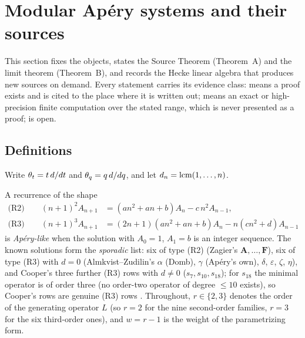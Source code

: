 \section{Modular Ap\'ery systems and their sources}\label{sec:sources}

This section fixes the objects, states the Source Theorem (Theorem~A) and the
limit theorem (Theorem~B), and records the Hecke linear algebra that produces
new sources on demand.  Every statement carries its evidence class:
\Proved{} means a proof exists and is cited to the place where it is written
out;  means an exact or high-precision finite computation
over the stated range, which is never presented as a proof; \Open{} is open.

\subsection{Definitions}\label{sec:defs}

Write $\theta_t=t\,d/dt$ and $\theta_q=q\,d/dq$, and let $d_n=\operatorname{lcm}(1,\dots,n)$.

\begin{definition}\label{def:sporadic}
A recurrence of the shape
\begin{align}
\text{(R2)}\qquad (n+1)^2A_{n+1}&=(an^2+an+b)A_n-c\,n^2A_{n-1},
\label{eq:R2}\\
\text{(R3)}\qquad (n+1)^3A_{n+1}&=(2n+1)(an^2+an+b)A_n-n(cn^2+d)A_{n-1}
\label{eq:R3}
\end{align}
is \emph{Ap\'ery-like} when the solution with $A_0=1$, $A_1=b$ is an integer
sequence.  The known solutions form the \emph{sporadic} list: six of type
(R2) (Zagier's $\mathbf A,\dots,\mathbf F$), six of type (R3) with $d=0$
(Almkvist--Zudilin's $\alpha$ (Domb), $\gamma$ (Ap\'ery's own), $\delta$,
$\varepsilon$, $\zeta$, $\eta$), and Cooper's three further (R3) rows with
$d\neq0$ ($s_7,s_{10},s_{18}$); for $s_{18}$ the minimal operator is of order
three (no order-two operator of degree $\le10$ exists), so Cooper's rows are
genuine (R3) rows \cite{Zagier2009,AlmkvistZudilin2006,Cooper2012}.
Throughout, $r\in\{2,3\}$ denotes the order of the generating operator $L$
(so $r=2$ for the nine second-order families, $r=3$ for the six third-order
ones), and $w=r-1$ is the weight of the parametrizing form.
\end{definition}


